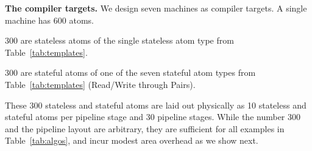
\medskip
\noindent
\textbf{The compiler targets.}
We design seven \absmachine machines as compiler targets. A single
\absmachine machine has 600 atoms.
\begin{CompactEnumerate}
\item 300 are stateless atoms of the single stateless atom type from
Table~\ref{tab:templates}.
\item 300 are stateful atoms of one of the seven stateful atom types from
Table~\ref{tab:templates} (Read/Write through Pairs).
\end{CompactEnumerate}
These 300 stateless and stateful atoms are laid out physically as 10 stateless
and stateful atoms per pipeline stage and 30 pipeline stages. While the number
300 and the pipeline layout are arbitrary, they are sufficient for all
examples in Table~\ref{tab:algos}, and incur modest area overhead
as we show next.

